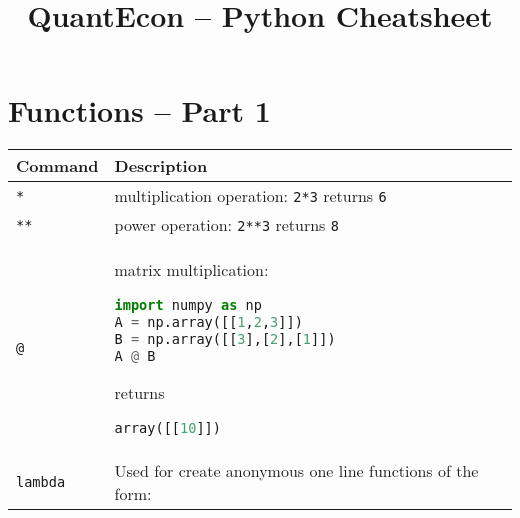 \title{QuantEcon -- Python Cheatsheet}

\section{Functions -- Part 1}\label{functions_pt1}

\begin{tabular}[]{@{}ll@{}}
\toprule
\begin{minipage}[b]{0.17\columnwidth}\raggedright
Command
\end{minipage} & \begin{minipage}[b]{0.77\columnwidth}\raggedright
Description
\end{minipage}\tabularnewline
\midrule
\begin{minipage}[t]{0.17\columnwidth}\raggedright
\lstinline!*!
\end{minipage} & \begin{minipage}[t]{0.77\columnwidth}\raggedright
multiplication operation: \lstinline!2*3! returns \lstinline!6!
\end{minipage}\tabularnewline
\begin{minipage}[t]{0.17\columnwidth}\raggedright
\lstinline!**!
\end{minipage} & \begin{minipage}[t]{0.77\columnwidth}\raggedright
power operation: \lstinline!2**3! returns \lstinline!8!
\end{minipage}\tabularnewline
\begin{minipage}[t]{0.17\columnwidth}\raggedright
\lstinline!@!
\end{minipage} & \begin{minipage}[t]{0.77\columnwidth}\raggedright
matrix multiplication:

\begin{lstlisting}[language=Python]
import numpy as np
A = np.array([[1,2,3]])
B = np.array([[3],[2],[1]])
A @ B
\end{lstlisting}

returns

\begin{lstlisting}[language=Python]
array([[10]])
\end{lstlisting}

\end{minipage}\tabularnewline
\begin{minipage}[t]{0.17\columnwidth}\raggedright
\lstinline!lambda!
\end{minipage} & \begin{minipage}[t]{0.77\columnwidth}\raggedright
Used for create anonymous one line functions of the form:


\end{minipage}
\end{tabular}
